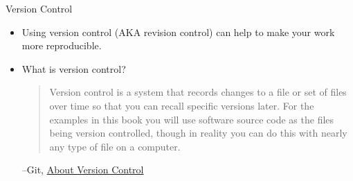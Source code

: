 \documentclass{beamer}
\begin{document}
\begin{frame}{Version Control}
\begin{itemize}[<.->]
\item
Using version control (AKA revision control) can help to make your work more reproducible.

\item
What is version control?

\begin{quote}
Version control is a system that records changes to a file or set of files over time so that you can recall specific versions later. For the examples in this book you will use software source code as the files being version controlled, though in reality you can do this with nearly any type of file on a computer.
\end{quote}
--Git, \href{https://git-scm.com/book/en/v2/Getting-Started-About-Version-Control}{About Version Control}
\end{itemize}
\end{frame}
\end{document}
